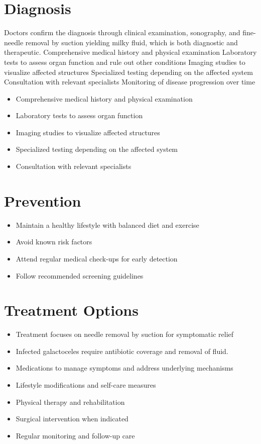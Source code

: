 \section{Diagnosis}
Doctors confirm the diagnosis through clinical examination, sonography, and fine-needle removal by suction yielding milky fluid, which is both diagnostic and therapeutic. Comprehensive medical history and physical examination Laboratory tests to assess organ function and rule out other conditions Imaging studies to visualize affected structures Specialized testing depending on the affected system Consultation with relevant specialists Monitoring of disease progression over time

\begin{itemize}[noitemsep]
  \item Comprehensive medical history and physical examination
  \item Laboratory tests to assess organ function
  \item Imaging studies to visualize affected structures
  \item Specialized testing depending on the affected system
  \item Consultation with relevant specialists
\end{itemize}
\section{Prevention}
\begin{itemize}[noitemsep]
  \item Maintain a healthy lifestyle with balanced diet and exercise
  \item Avoid known risk factors
  \item Attend regular medical check-ups for early detection
  \item Follow recommended screening guidelines
\end{itemize}
\section{Treatment Options}
\begin{itemize}[noitemsep]
  \item Treatment focuses on needle removal by suction for symptomatic relief
  \item Infected galactoceles require antibiotic coverage and removal of fluid.
  \item Medications to manage symptoms and address underlying mechanisms
  \item Lifestyle modifications and self-care measures
  \item Physical therapy and rehabilitation
  \item Surgical intervention when indicated
  \item Regular monitoring and follow-up care
\end{itemize}
